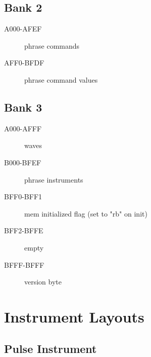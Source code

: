 \subsection{Bank 2}

\begin{description}
    \item[A000-AFEF] phrase commands
    \item[AFF0-BFDF] phrase command values
\end{description}

\subsection{Bank 3}

\begin{description}
    \item[A000-AFFF] waves
    \item[B000-BFEF] phrase instruments
    \item[BFF0-BFF1] mem initialized flag (set to "rb" on init)
    \item[BFF2-BFFE] empty
    \item[BFFF-BFFF] version byte
\end{description}

\section{Instrument Layouts}

\subsection{Pulse Instrument}

\tablehead{}

